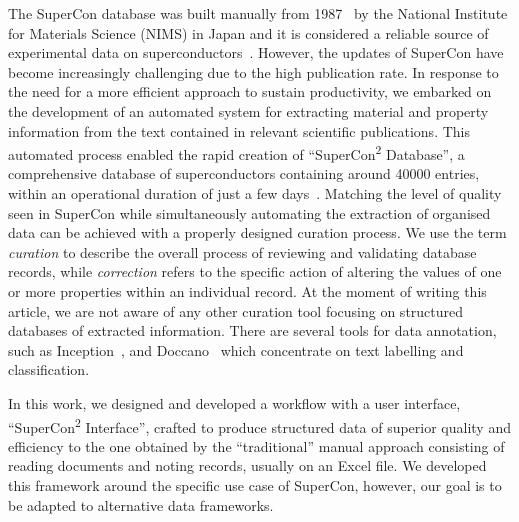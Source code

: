 \documentclass[]{interact}
\theoremstyle{plain} %
\theoremstyle{definition}
\theoremstyle{remark}
\begin{document}

The SuperCon database was built manually from 1987~\cite{ishii2023structuring} by the National Institute for Materials Science (NIMS) in Japan and it is considered a reliable source of experimental data on superconductors~\cite{roter2020predicting, stanev_machine_2017, tran2022machine, konno2021deep}. 
However, the updates of SuperCon have become increasingly challenging due to the high publication rate. 
In response to the need for a more efficient approach to sustain productivity, we embarked on the development of an automated system for extracting material and property information from the text contained in relevant scientific publications. 
This automated process enabled the rapid creation of ``SuperCon\textsuperscript{2} Database'', a comprehensive database of superconductors containing around 40000 entries, within an operational duration of just a few days~\cite{lfoppiano2023automatic}. 
Matching the level of quality seen in SuperCon while simultaneously automating the extraction of organised data can be achieved with a properly designed curation process. 
We use the term \emph{curation} to describe the overall process of reviewing and validating database records, while \emph{correction} refers to the specific action of altering the values of one or more properties within an individual record.
At the moment of writing this article, we are not aware of any other curation tool focusing on structured databases of extracted information. 
There are several tools for data annotation, such as Inception~\cite{klie-etal-2018-inception}, and Doccano~\cite{doccano} which concentrate on text labelling and classification.

In this work, we designed and developed a workflow with a user interface, ``SuperCon\textsuperscript{2} Interface'', crafted to produce structured data of superior quality and efficiency to the one obtained by the ``traditional'' manual approach consisting of reading documents and noting records, usually on an Excel file.
We developed this framework around the specific use case of SuperCon, however, our goal is to be adapted to alternative data frameworks.
\end{document}
